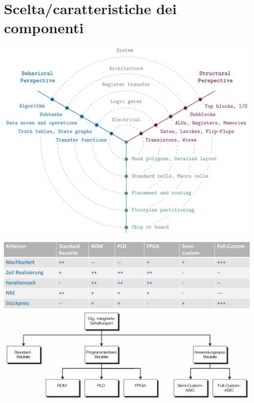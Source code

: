 \section{Scelta/caratteristiche dei componenti}
    \noindent
    \begin{minipage}[t]{0.48\columnwidth}
        \vspace{0pt} %
        \includegraphics[width=\linewidth]{Images/DevelopmentModel.png}
    \end{minipage}%
    \hfill
    \begin{minipage}[t]{0.48\columnwidth}
        \vspace{0pt} %
        \includegraphics[width=\linewidth]{Images/WhalDerRealisirungsform.png}\\[1ex]
        \includegraphics[width=\linewidth]{Images/ClassificationeDeiComponenti.png}
    \end{minipage}